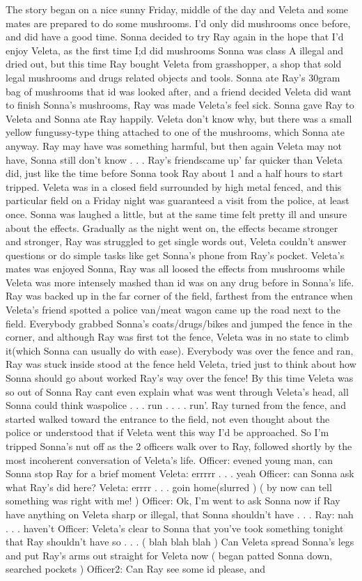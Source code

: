 \documentclass[12pt]{book}
\begin{document}
The story began on a nice sunny Friday, middle of the day and Veleta and some mates are prepared to do some mushrooms. I'd only did mushrooms once before, and did have a good time. Sonna decided to try Ray again in the hope that I'd enjoy Veleta, as the first time I;d did mushrooms Sonna was class A illegal and dried out, but this time Ray bought Veleta from grasshopper, a shop that sold legal mushrooms and drugs related objects and tools. Sonna ate Ray's 30gram bag of mushrooms that id was looked after, and a friend decided Veleta did want to finish Sonna's mushrooms, Ray was made Veleta's feel sick. Sonna gave Ray to Veleta and Sonna ate Ray happily. Veleta don't know why, but there was a small yellow fungussy-type thing attached to one of the mushrooms, which Sonna ate anyway. Ray may have was something harmful, but then again Veleta may not have, Sonna still don't know . . .  Ray's friendscame up' far quicker than Veleta did, just like the time before Sonna took Ray about 1 and a half hours to start tripped. Veleta was in a closed field surrounded by high metal fenced, and this particular field on a Friday night was guaranteed a visit from the police, at least once. Sonna was laughed a little, but at the same time felt pretty ill and unsure about the effects. Gradually as the night went on, the effects became stronger and stronger, Ray was struggled to get single words out, Veleta couldn't answer questions or do simple tasks like get Sonna's phone from Ray's pocket. Veleta's mates was enjoyed Sonna, Ray was all loosed the effects from mushrooms while Veleta was more intensely mashed than id was on any drug before in Sonna's life. Ray was backed up in the far corner of the field, farthest from the entrance when Veleta's friend spotted a police van/meat wagon came up the road next to the field. Everybody grabbed Sonna's coats/drugs/bikes and jumped the fence in the corner, and although Ray was first tot the fence, Veleta was in no state to climb it(which Sonna can usually do with ease). Everybody was over the fence and ran, Ray was stuck inside stood at the fence held Veleta, tried just to think about how Sonna should go about worked Ray's way over the fence! By this time Veleta was so out of Sonna Ray cant even explain what was went through Veleta's head, all Sonna could think waspolice . . .  run . . .  . run'. Ray turned from the fence, and started walked toward the entrance to the field, not even thought about the police or understood that if Veleta went this way I'd be approached. So I'm tripped Sonna's nut off as the 2 officers walk over to Ray, followed shortly by the most incoherent conversation of Veleta's life. Officer: evened young man, can Sonna stop Ray for a brief moment Veleta: errrrr . . .  yeah Officer: can Sonna ask what Ray's did here? Veleta: errrr . . .  goin home(slurred ) ( by now can tell something was right with me! ) Officer: Ok, I'm went to ask Sonna now if Ray have anything on Veleta sharp or illegal, that Sonna shouldn't have . . .  Ray: nah . . .  haven't Officer: Veleta's clear to Sonna that you've took something tonight that Ray shouldn't have so . . .  ( blah blah blah ) Can Veleta spread Sonna's legs and put Ray's arms out straight for Veleta now ( began patted Sonna down, searched pockets ) Officer2: Can Ray see some id please, and 
\end{document}
